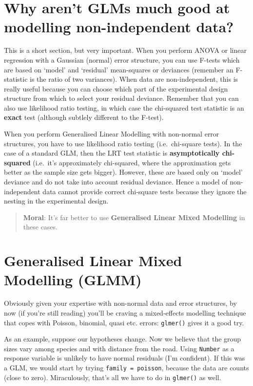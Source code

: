 \documentclass[]{book}
\theoremstyle{definition}
\theoremstyle{definition}
\theoremstyle{definition}
\theoremstyle{remark}
\begin{document}
\section{Why aren't GLMs much good at modelling non-independent
data?}\label{why-arent-glms-much-good-at-modelling-non-independent-data}

This is a short section, but very important. When you perform ANOVA or
linear regression with a Gaussian (normal) error structure, you can use
F-tests which are based on `model' and `residual' mean-squares or
deviances (remember an F-statistic is the ratio of two variances). When
data are non-independent, this is really useful because you can choose
which part of the experimental design structure from which to select
your residual deviance. Remember that you can also use likelihood ratio
testing, in which case the chi-squared test statistic is an
\textbf{exact} test (although subtlely different to the F-test).

When you perform Generalised Linear Modelling with non-normal error
structures, you have to use likelihood ratio testing (i.e.~chi-square
tests). In the case of a standard GLM, then the LRT test statistic is
\textbf{asymptotically chi-squared} (i.e.~it's approximately
chi-squared, where the approximation gets better as the sample size gets
bigger). However, these are based only on `model' deviance and do not
take into account residual deviance. Hence a model of non-independent
data cannot provide correct chi-square tests because they ignore the
nesting in the experimental design.

\begin{quote}
\textbf{Moral}: It's far better to use \textbf{Generalised Linear Mixed
Modelling} in these cases.
\end{quote}

\section{Generalised Linear Mixed Modelling
(GLMM)}\label{generalised-linear-mixed-modelling-glmm}

Obviously given your expertise with non-normal data and error
structures, by now (if you're still reading) you'll be craving a
mixed-effects modelling technique that copes with Poisson, binomial,
quasi etc. errors: \texttt{glmer()} gives it a good try.

As an example, suppose our hypotheses change. Now we believe that the
group sizes vary among species and with distance from the road. Using
\texttt{Number} as a response variable is unlikely to have normal
residuals (I'm confident). If this was a GLM, we would start by trying
\texttt{family\ =\ poisson}, because the data are counts (close to
zero). Miraculously, that's all we have to do in \texttt{glmer()} as
well.
\end{document}
